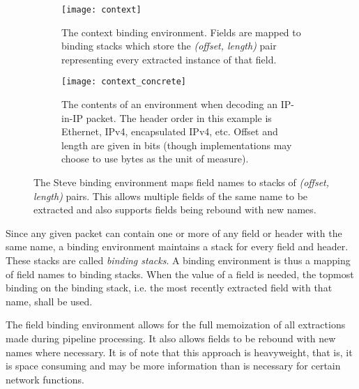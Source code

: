 \begin{figure}[ht]
\begin{subfigure}[t]{.45\textwidth}
  \centering
  \texttt{[image: context]}
  \caption{The context binding environment. Fields are mapped to binding stacks which store the \emph{(offset, length)} pair representing every extracted instance of that field.}
  \label{fg:context1}
\end{subfigure}
\hfill
\begin{subfigure}[t]{.45\textwidth}
  \centering
  \texttt{[image: context\_concrete]}
  \caption{The contents of an environment when decoding an IP-in-IP packet. The header order in this example is Ethernet, IPv4, encapsulated IPv4, etc. Offset and length are given in bits (though implementations
  may choose to use bytes as the unit of measure).}
  \label{fg:context2}
\end{subfigure}


\caption{The Steve binding environment maps field names to stacks of
  \emph{(offset, length)} pairs. This allows multiple fields of the same
  name to be extracted and also supports fields being rebound with new names.}
\label{fg:ContextEnv}
\end{figure}

Since any given packet can contain one or more of any field or header with the
same name, a binding environment maintains a stack for every field and header.
These stacks are called \emph{binding stacks}. A binding environment is thus a 
mapping of field names to binding stacks. 
When the value of a field is needed, 
the topmost binding on the binding stack, i.e. the
most recently extracted field with that name, shall be used.

The field binding environment allows for the full memoization of all
extractions made during pipeline processing. It also allows fields to
be rebound with new names where necessary. It is of note that this
approach is heavyweight, that is, it is space consuming and may be
more information than is necessary for certain network functions.

